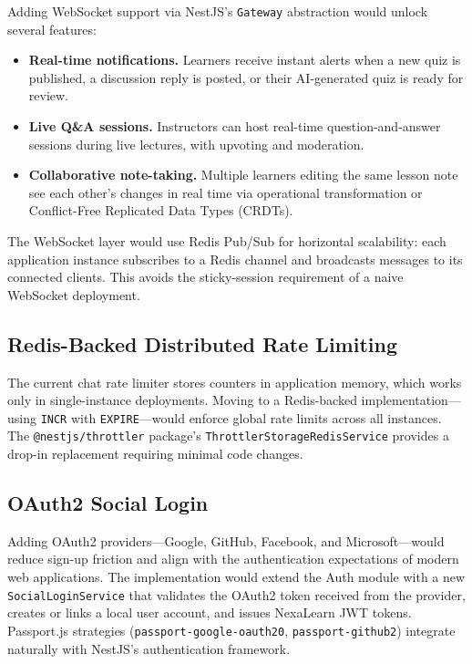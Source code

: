 Adding WebSocket support via NestJS's \texttt{Gateway} abstraction would unlock several features:

\begin{itemize}
  \item \textbf{Real-time notifications.} Learners receive instant alerts when a new quiz is published, a discussion reply is posted, or their AI-generated quiz is ready for review.
  \item \textbf{Live Q\&A sessions.} Instructors can host real-time question-and-answer sessions during live lectures, with upvoting and moderation.
  \item \textbf{Collaborative note-taking.} Multiple learners editing the same lesson note see each other's changes in real time via operational transformation or Conflict-Free Replicated Data Types (CRDTs).
\end{itemize}

The WebSocket layer would use Redis Pub/Sub for horizontal scalability: each application instance subscribes to a Redis channel and broadcasts messages to its connected clients. This avoids the sticky-session requirement of a naive WebSocket deployment.

\subsection{Redis-Backed Distributed Rate Limiting}

The current chat rate limiter stores counters in application memory, which works only in single-instance deployments. Moving to a Redis-backed implementation---using \texttt{INCR} with \texttt{EXPIRE}---would enforce global rate limits across all instances. The \texttt{@nestjs/throttler} package's \texttt{ThrottlerStorageRedisService} provides a drop-in replacement requiring minimal code changes.

\subsection{OAuth2 Social Login}

Adding OAuth2 providers---Google, GitHub, Facebook, and Microsoft---would reduce sign-up friction and align with the authentication expectations of modern web applications. The implementation would extend the Auth module with a new \texttt{SocialLoginService} that validates the OAuth2 token received from the provider, creates or links a local user account, and issues NexaLearn JWT tokens. Passport.js strategies (\texttt{passport-google-oauth20}, \texttt{passport-github2}) integrate naturally with NestJS's authentication framework.


